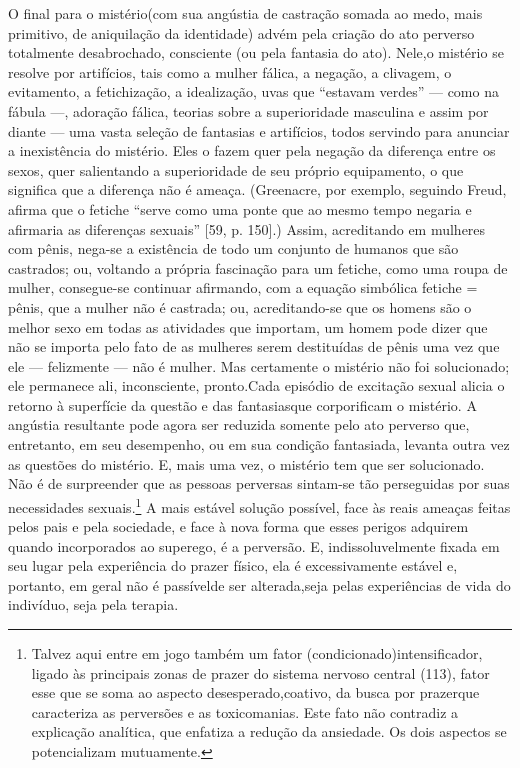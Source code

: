 O final para o mistério\idxmistabo[|(] (com sua angústia de castração somada ao
medo, mais primitivo, de aniquilação da identidade) advém pela criação
do ato perverso totalmente desabrochado, consciente (ou pela fantasia
do ato). Nele,\idxnega[|(] o mistério se resolve por artifícios, tais como a mulher
fálica, a negação, a clivagem, o evitamento, a fetichização, a
idealização, uvas que ``estavam verdes'' ---
como na fábula ---, adoração fálica, teorias sobre a superioridade
masculina\idxmascsu{} e assim por diante --- uma vasta seleção de fantasias e
artifícios, todos servindo para anunciar a inexistência do mistério.
Eles o fazem quer pela negação da diferença entre os sexos,\idxpervnegac{} quer
salientando a superioridade de seu próprio equipamento, o que significa
que a diferença não é ameaça. (Greenacre,\idxgrena{} por exemplo, seguindo Freud,\idxfreud{}
afirma que o fetiche ``serve como uma ponte que ao mesmo
tempo negaria e afirmaria as diferenças sexuais'' [59, p.
150].) Assim, acreditando em mulheres com pênis, nega-se a existência
de todo um conjunto de humanos que são castrados; ou, voltando a
própria fascinação para um fetiche, como uma roupa\idxroup{} de mulher,
consegue-se continuar afirmando, com a equação simbólica fetiche =
pênis, que a mulher não é castrada; ou, acreditando-se que os homens
são o melhor sexo em todas as atividades que importam, um homem pode
dizer que não se importa pelo fato de as mulheres serem destituídas de
pênis uma vez que ele --- felizmente --- não é mulher. Mas certamente
o mistério não foi solucionado; ele permanece ali, inconsciente,
pronto.\idxnega[|)] Cada episódio de excitação sexual alicia o retorno à
superfície da questão e das fantasias\idxfanta[|(] que corporificam o mistério. A
angústia resultante pode agora ser reduzida somente pelo ato perverso
que, entretanto, em seu desempenho, ou em sua condição fantasiada,
levanta outra vez as questões do mistério. E, mais uma vez, o mistério
tem que ser solucionado.\idxpervdeses{} Não é de surpreender que as pessoas perversas
sintam-se tão perseguidas por suas necessidades sexuais.\footnote{ Talvez
aqui entre em jogo também um fator (condicionado)\idxcond[|nn]
intensificador, ligado às principais zonas de prazer do sistema nervoso
central (113), fator esse que se soma ao aspecto desesperado,\idxpervdeses[|nn] coativo,
da busca por prazer\idxpraz[|nn] que caracteriza as perversões e as toxicomanias.
Este fato não contradiz a explicação analítica, que enfatiza a redução
da ansiedade. Os dois aspectos se potencializam mutuamente.} A mais
estável solução possível, face às reais ameaças feitas pelos pais e
pela sociedade, e face à nova forma que esses perigos adquirem quando
incorporados ao superego, é a perversão. E, indissoluvelmente fixada em
seu lugar pela experiência do prazer físico, ela é excessivamente
estável e, portanto, em geral não é passível\idxpraz[|)] de ser alterada,\idxmistabo[|)] seja
pelas experiências de vida do indivíduo, seja pela terapia.


